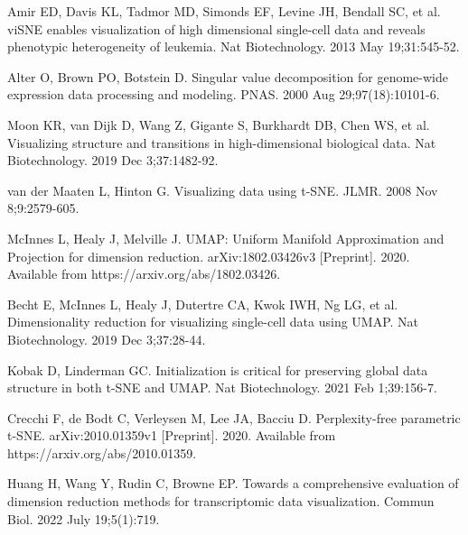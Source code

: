 \documentclass[10pt,letterpaper]{article}
\begin{document}
%
%
% 
\begin{thebibliography}{10}

Amir ED, Davis KL, Tadmor MD, Simonds EF, Levine JH, Bendall SC, et al.
\newblock viSNE enables visualization of high dimensional single-cell data and reveals phenotypic heterogeneity of leukemia.
\newblock Nat Biotechnology. 2013 May 19;31:545-52.

Alter O, Brown PO, Botstein D.
\newblock Singular value decomposition for genome-wide expression data processing and modeling.
\newblock PNAS. 2000 Aug 29;97(18):10101-6.

Moon KR, van Dijk D, Wang Z, Gigante S, Burkhardt DB, Chen WS, et al.
\newblock Visualizing structure and transitions in high-dimensional biological data.
\newblock Nat Biotechnology. 2019 Dec 3;37:1482-92.

van der Maaten L, Hinton G.
\newblock Visualizing data using t-SNE.
\newblock JLMR. 2008 Nov 8;9:2579-605.

McInnes L, Healy J, Melville J.
\newblock UMAP: Uniform Manifold Approximation and Projection for dimension reduction.
\newblock arXiv:1802.03426v3 [Preprint]. 2020. Available from https://arxiv.org/abs/1802.03426.

Becht E, McInnes L, Healy J, Dutertre CA, Kwok IWH, Ng LG, et al.
\newblock Dimensionality reduction for visualizing single-cell data using UMAP.
\newblock Nat Biotechnology. 2019 Dec 3;37:28-44.

Kobak D, Linderman GC.
\newblock Initialization is critical for preserving global data structure in both t-SNE and UMAP.
\newblock Nat Biotechnology. 2021 Feb 1;39:156-7.

Crecchi F, de Bodt C, Verleysen M, Lee JA, Bacciu D.
\newblock Perplexity-free parametric t-SNE.
\newblock arXiv:2010.01359v1 [Preprint]. 2020. Available from https://arxiv.org/abs/2010.01359.

Huang H, Wang Y, Rudin C, Browne EP.
\newblock Towards a comprehensive evaluation of dimension reduction methods for transcriptomic data visualization.
\newblock Commun Biol. 2022 July 19;5(1):719.


\end{thebibliography}
\end{document}

